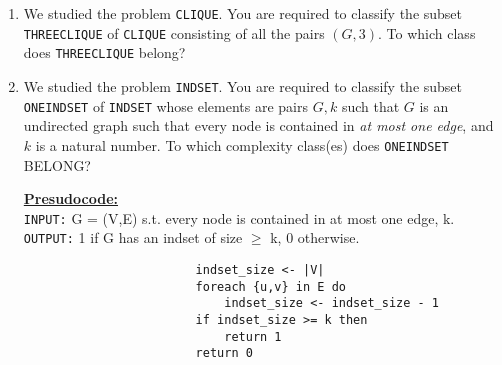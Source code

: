 \documentclass{article}
\begin{document}
\begin{enumerate}[label=\textbf{\arabic*.}, leftmargin=*]
\begin{pane}
				\end{pane}
				\item We studied the problem \texttt{CLIQUE}. You are required to classify the subset \texttt{THREECLIQUE} of \texttt{CLIQUE} consisting of all the pairs $(G, 3)$. To which class does \texttt{THREECLIQUE} belong?
				\begin{pane}
						
				\end{pane}
				\item We studied the problem \texttt{INDSET}. You are required to classify the subset \texttt{ONEINDSET} of \texttt{INDSET} whose elements are pairs $G,k$ such that $G$ is an undirected graph such that every node is contained in \emph{at most one edge}, and $k$ is a natural number. To which complexity class(es) does \texttt{ONEINDSET} BELONG?
				\begin{pane}
					\textbf{\uline{Presudocode:}}\\
					
					\texttt{INPUT:} G = (V,E) s.t. every node is contained in at most one edge, k.\\
					\texttt{OUTPUT:} 1 if G has an indset of size $\geq$ k, 0 otherwise.
					\begin{verbatim}
						indset_size <- |V|
						foreach {u,v} in E do
						    indset_size <- indset_size - 1
						if indset_size >= k then
						    return 1
						return 0
					\end{verbatim}
				\end{pane}
			\end{enumerate}
\end{document}
